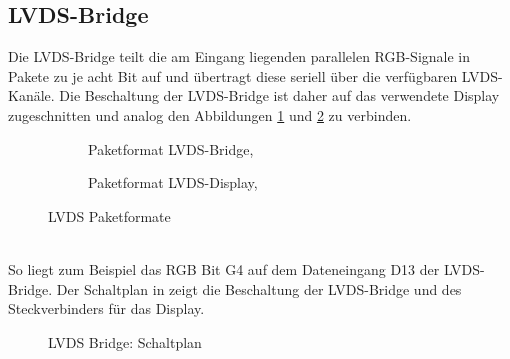 \subsection{LVDS-Bridge}
Die LVDS-Bridge teilt die am Eingang liegenden parallelen RGB-Signale in Pakete zu je acht Bit auf und übertragt diese seriell über die verfügbaren LVDS-Kanäle. Die Beschaltung der LVDS-Bridge ist daher auf das verwendete Display  zugeschnitten und analog den Abbildungen \ref{fig:teilb_lvds_bridge_format} und \ref{fig:teilb_lvds_display_format} zu verbinden.
\begin{figure}[htbp]
        \begin{center}
        \begin{subfigure}[htp]{0.48\textwidth}
 			\caption{Paketformat LVDS-Bridge, \cite{TI2011b}}
            \label{fig:teilb_lvds_bridge_format}
        \end{subfigure}
        \quad
        \begin{subfigure}[htp]{0.48\textwidth}
            \caption{Paketformat LVDS-Display, \cite{LG2012}}
            \label{fig:teilb_lvds_display_format}
        \end{subfigure}
		\end{center}
        \caption{LVDS Paketformate}
        \label{fig:teilb_lvds_format}
\end{figure} \\
So liegt zum Beispiel das RGB Bit G4 auf dem Dateneingang D13 der LVDS-Bridge. Der Schaltplan in  zeigt die Beschaltung der LVDS-Bridge und des Steckverbinders für das Display.\\
\begin{figure}[htp]
		\center
        \caption{LVDS Bridge: Schaltplan}
       \label{fig:teilb_lvds_bridge_sch}
\end{figure}\\
